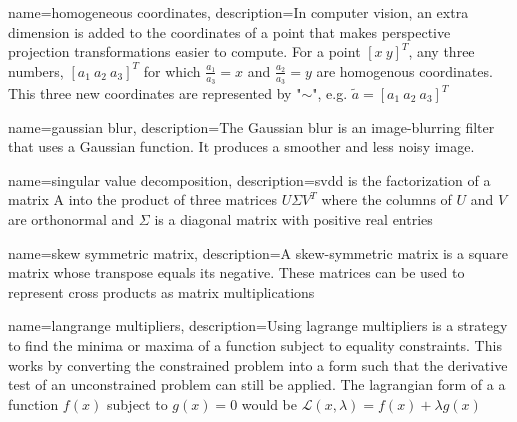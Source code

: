 
{	
	name={homogeneous coordinates}, 
	description={In computer vision, an extra dimension is added to the coordinates of a point that makes perspective projection transformations easier to compute. For a point $[x \ y]^T$, any three numbers, $[a_1 \ a_2 \ a_3]^T$ for which $\frac{a_1}{a_3} = x$ and $\frac{a_2}{a_3} = y$ are homogenous coordinates. This three new coordinates are represented by "$\sim$", e.g. $\widetilde{a} = [a_1 \ a_2 \ a_3]^T$}
}

{	
	name={gaussian blur}, 
	description={The Gaussian blur is an image-blurring filter that uses a Gaussian function. It produces a smoother and less noisy image.}
}

{
	name={singular value decomposition},
	description={\acrfull{svdd} is  the  factorization  of a matrix A into  the product of three matrices $U$$\Sigma$$V^T$   where the columns of $U$ and $V$ are orthonormal and $\Sigma$ is a diagonal matrix with positive real entries}
}

{
	name={skew symmetric matrix},
	description={A skew-symmetric matrix is a square matrix whose transpose equals its negative. These matrices can be used to represent cross products as matrix multiplications}
}

{
	name={langrange multipliers},
	description={Using lagrange multipliers is a strategy to find the minima or maxima of a function subject to equality constraints. This works by converting the constrained problem into a form such that the derivative test of an unconstrained problem can still be applied. The lagrangian form of a a function $f(x)$ subject to $g(x) = 0$ would be $\mathcal{L}(x, \lambda)=f(x)+\lambda g(x)$}
}

